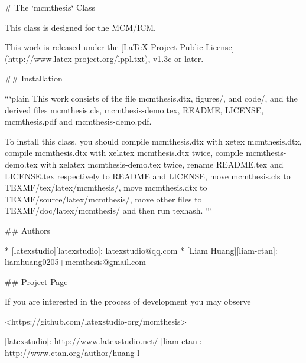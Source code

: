 # The `mcmthesis` Class

This class is designed for the MCM/ICM.

This work is released under the [LaTeX Project Public
License](http://www.latex-project.org/lppl.txt), v1.3c or later.

## Installation

```plain
This work consists of the file mcmthesis.dtx,
                               figures/, and
                               code/,
and the derived files          mcmthesis.cls,
                               mcmthesis-demo.tex,
                               README,
                               LICENSE,
                               mcmthesis.pdf and
                               mcmthesis-demo.pdf.

To install this class, you should
    compile mcmthesis.dtx      with xetex mcmthesis.dtx,
    compile mcmthesis.dtx      with xelatex mcmthesis.dtx twice,
    compile mcmthesis-demo.tex with xelatex mcmthesis-demo.tex twice,
    rename README.tex and LICENSE.tex respectively to README and LICENSE,
    move mcmthesis.cls         to TEXMF/tex/latex/mcmthesis/,
    move mcmthesis.dtx         to TEXMF/source/latex/mcmthesis/,
    move other files           to TEXMF/doc/latex/mcmthesis/ and then
    run texhash.
```

## Authors

* [latexstudio][latexstudio]: latexstudio@qq.com
* [Liam Huang][liam-ctan]: liamhuang0205+mcmthesis@gmail.com

## Project Page

If you are interested in the process of development you may observe

<https://github.com/latexstudio-org/mcmthesis>

[latexstudio]: http://www.latexstudio.net/
[liam-ctan]: http://www.ctan.org/author/huang-l
